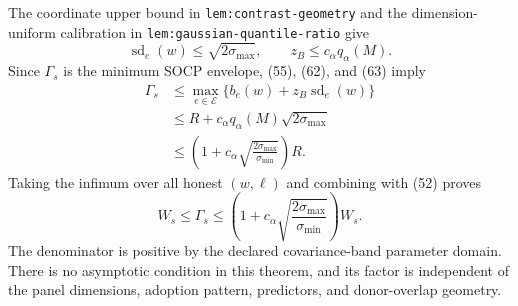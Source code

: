 The coordinate upper bound in \texttt{lem:contrast-geometry} and the
dimension-uniform calibration in \texttt{lem:gaussian-quantile-ratio} give
\[
 \operatorname{sd}_e(w)\leq\sqrt{2\sigma_{\max}},
 \qquad
 z_B\leq c_\alpha q_\alpha(M). \tag{63}
\]
Since \(\Gamma_s\) is the minimum SOCP envelope, (55), (62), and (63) imply
\[
\begin{aligned}
 \Gamma_s
 &\leq\max_{e\in\mathcal E}
       \{b_e(w)+z_B\operatorname{sd}_e(w)\}\\
 &\leq R+c_\alpha q_\alpha(M)\sqrt{2\sigma_{\max}}\\
 &\leq\left(1+c_\alpha
       \sqrt{\frac{2\sigma_{\max}}{\sigma_{\min}}}\right)R.
\end{aligned} \tag{64}
\]
Taking the infimum over all honest \((w,\ell)\) and combining with (52)
proves
\[
 W_s\leq\Gamma_s\leq
 \left(1+c_\alpha
 \sqrt{\frac{2\sigma_{\max}}{\sigma_{\min}}}\right)W_s.
\]
The denominator is positive by the declared covariance-band parameter domain.
There is no asymptotic condition in this theorem, and its factor is independent
of the panel dimensions, adoption pattern, predictors, and donor-overlap
geometry.

